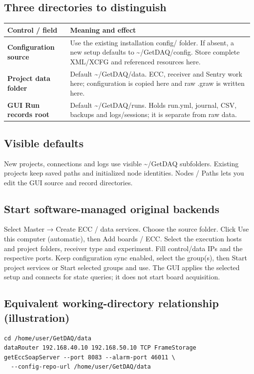 \documentclass[11pt,a4paper]{article}
\newcommand{\ui}[1]{\textbf{#1}}
\begin{document}
\subsection*{Three directories to distinguish}
\begin{tabularx}{\linewidth}{@{}L{58mm}Y@{}}\toprule
Control / field & Meaning and effect \\\midrule
\ui{Configuration source} & Use the existing installation config/ folder. If absent, a new setup defaults to \textasciitilde{}/GetDAQ/config. Store complete XML/XCFG and referenced resources here.\\
\ui{Project data folder} & Default \textasciitilde{}/GetDAQ/data. ECC, receiver and Sentry work here; configuration is copied here and raw .graw is written here.\\
\ui{GUI Run records root} & Default \textasciitilde{}/GetDAQ/runs. Holds run.yml, journal, CSV, backups and logs/sessions; it is separate from raw data.\\
\bottomrule\end{tabularx}
\subsection*{Visible defaults}
New projects, connections and logs use visible \textasciitilde{}/GetDAQ subfolders. Existing projects keep saved paths and initialized node identities. Nodes / Paths lets you edit the GUI source and record directories.

\subsection*{Start software-managed original backends}
Select Master → Create ECC / data services. Choose the source folder. Click Use this computer (automatic), then Add boards / ECC. Select the execution hosts and project folders, receiver type and experiment. Fill control/data IPs and the respective ports. Keep configuration sync enabled, select the group(s), then Start project services or Start selected groups and use. The GUI applies the selected setup and connects for state queries; it does not start board acquisition.

\subsection*{Equivalent working-directory relationship (illustration)}
\begin{verbatim}
cd /home/user/GetDAQ/data
dataRouter 192.168.40.10 192.168.50.10 TCP FrameStorage
getEccSoapServer --port 8083 --alarm-port 46011 \
  --config-repo-url /home/user/GetDAQ/data
\end{verbatim}
\end{document}
